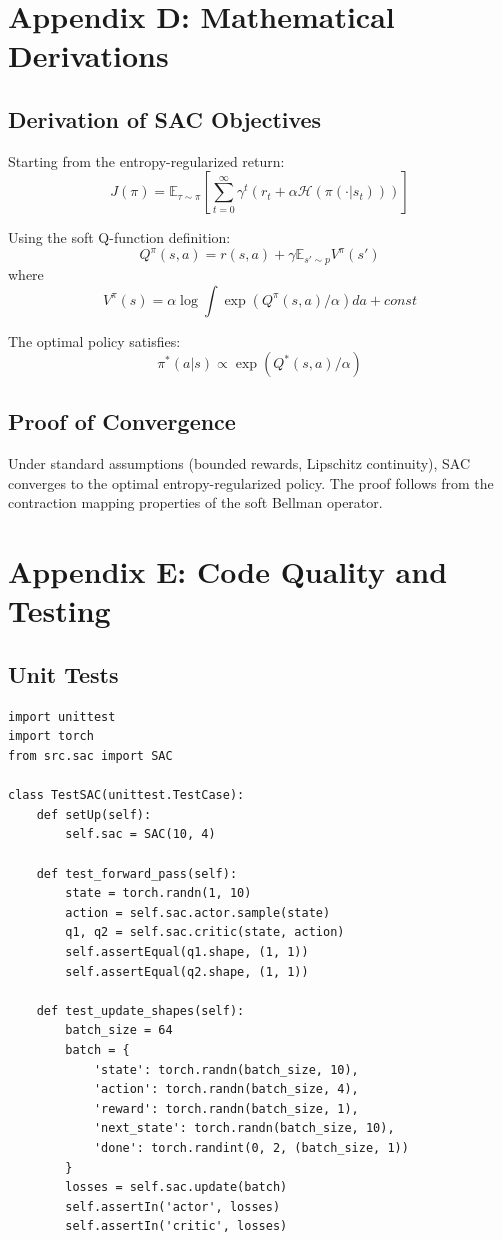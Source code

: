 \documentclass[11pt,a4paper]{article}
\begin{document}
\section{Appendix D: Mathematical Derivations}
\subsection{Derivation of SAC Objectives}
Starting from the entropy-regularized return:
\[
J(\pi) = \mathbb{E}_{\tau \sim \pi} \left[ \sum_{t=0}^\infty \gamma^t (r_t + \alpha \mathcal{H}(\pi(\cdot|s_t))) \right]
\]

Using the soft Q-function definition:
\[
Q^\pi(s,a) = r(s,a) + \gamma \mathbb{E}_{s' \sim p} V^\pi(s')
\]
where
\[
V^\pi(s) = \alpha \log \int \exp(Q^\pi(s,a)/\alpha) da + const
\]

The optimal policy satisfies:
\[
\pi^*(a|s) \propto \exp(Q^*(s,a)/\alpha)
\]

\subsection{Proof of Convergence}
Under standard assumptions (bounded rewards, Lipschitz continuity), SAC converges to the optimal entropy-regularized policy. The proof follows from the contraction mapping properties of the soft Bellman operator.

\section{Appendix E: Code Quality and Testing}
\subsection{Unit Tests}
\begin{lstlisting}
import unittest
import torch
from src.sac import SAC

class TestSAC(unittest.TestCase):
    def setUp(self):
        self.sac = SAC(10, 4)
    
    def test_forward_pass(self):
        state = torch.randn(1, 10)
        action = self.sac.actor.sample(state)
        q1, q2 = self.sac.critic(state, action)
        self.assertEqual(q1.shape, (1, 1))
        self.assertEqual(q2.shape, (1, 1))
    
    def test_update_shapes(self):
        batch_size = 64
        batch = {
            'state': torch.randn(batch_size, 10),
            'action': torch.randn(batch_size, 4),
            'reward': torch.randn(batch_size, 1),
            'next_state': torch.randn(batch_size, 10),
            'done': torch.randint(0, 2, (batch_size, 1))
        }
        losses = self.sac.update(batch)
        self.assertIn('actor', losses)
        self.assertIn('critic', losses)
\end{lstlisting}
\end{document}
